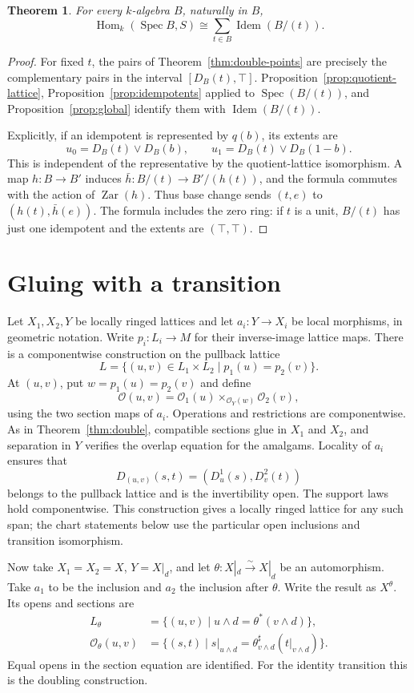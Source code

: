 \documentclass[11pt]{amsart}
\newtheorem{theorem}{Theorem}[section]
\theoremstyle{definition}
\theoremstyle{remark}
\newcommand{\Zar}{\operatorname{Zar}}
\newcommand{\Spec}{\operatorname{Spec}}
\newcommand{\Hom}{\operatorname{Hom}}
\newcommand{\Idem}{\operatorname{Idem}}
\newcommand{\OO}{\mathcal O}
\newcommand{\restr}[2]{#1|_{#2}}
\begin{document}
\begin{theorem}\label{thm:double-idempotents}
For every $k$-algebra $B$, naturally in $B$,
\[
 \Hom_k(\Spec B,S)\cong\sum_{t\in B}\Idem(B/(t)).
\]
\end{theorem}
\begin{proof}
For fixed $t$, the pairs of Theorem~\ref{thm:double-points} are precisely
the complementary pairs in the interval $[D_B(t),\top]$.
Proposition~\ref{prop:quotient-lattice},
Proposition~\ref{prop:idempotents} applied to $\Spec(B/(t))$, and
Proposition~\ref{prop:global} identify them with $\Idem(B/(t))$.

Explicitly, if an idempotent is represented by $q(b)$, its extents are
\[
 u_0=D_B(t)\vee D_B(b),\qquad
 u_1=D_B(t)\vee D_B(1-b).
\]
This is independent of the representative by the quotient-lattice
isomorphism. A map $h:B\to B'$ induces
$\bar h:B/(t)\to B'/(h(t))$, and the formula commutes with the action of
$\Zar(h)$. Thus base change sends $(t,e)$ to $(h(t),\bar h(e))$.
The formula includes the zero ring: if $t$ is a unit, $B/(t)$ has just
one idempotent and the extents are $(\top,\top)$.
\end{proof}

\section{Gluing with a transition}

Let $X_1,X_2,Y$ be locally ringed lattices and let
$a_i:Y\to X_i$ be local morphisms, in geometric notation. Write
$p_i:L_i\to M$ for their inverse-image lattice maps. There is a
componentwise construction on the pullback lattice
\[
 L=\{(u,v)\in L_1\times L_2\mid p_1(u)=p_2(v)\}.
\]
At $(u,v)$, put $w=p_1(u)=p_2(v)$ and define
\[
 \OO(u,v)=\OO_1(u)\times_{\OO_Y(w)}\OO_2(v),
\]
using the two section maps of $a_i$. Operations and restrictions are
componentwise. As in Theorem~\ref{thm:double}, compatible sections glue
in $X_1$ and $X_2$, and separation in $Y$ verifies the overlap equation
for the amalgams. Locality of $a_i$ ensures that
\[
 D_{(u,v)}(s,t)=(D^1_u(s),D^2_v(t))
\]
belongs to the pullback lattice and is the invertibility open.
The support laws hold componentwise. This construction gives a locally
ringed lattice for any such span; the chart statements below use the
particular open inclusions and transition isomorphism.

Now take $X_1=X_2=X$, $Y=X|_d$, and let
$\theta:X|_d\xrightarrow{\sim}X|_d$ be an automorphism. Take $a_1$ to
be the inclusion and $a_2$ the inclusion after $\theta$. Write the
result as $X^\theta$. Its opens and sections are
\begin{align*}
 L_\theta&=\{(u,v)\mid u\wedge d=\theta^*(v\wedge d)\},\\
 \OO_\theta(u,v)&=\{(s,t)\mid
 \restr{s}{u\wedge d}
 =\theta^\sharp_{v\wedge d}(\restr{t}{v\wedge d})\}.
\end{align*}
Equal opens in the section equation are identified. For the identity
transition this is the doubling construction.
\end{document}
